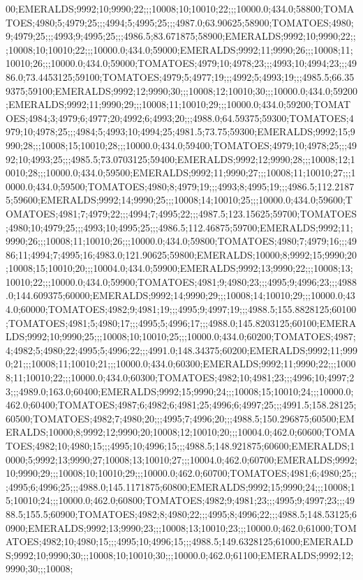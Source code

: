 00;EMERALDS;9992;10;9990;22;;;10008;10;10010;22;;;10000.0;434.0;58800;TOMATOES;4980;5;4979;25;;;4994;5;4995;25;;;4987.0;63.90625;58900;TOMATOES;4980;9;4979;25;;;4993;9;4995;25;;;4986.5;83.671875;58900;EMERALDS;9992;10;9990;22;;;10008;10;10010;22;;;10000.0;434.0;59000;EMERALDS;9992;11;9990;26;;;10008;11;10010;26;;;10000.0;434.0;59000;TOMATOES;4979;10;4978;23;;;4993;10;4994;23;;;4986.0;73.4453125;59100;TOMATOES;4979;5;4977;19;;;4992;5;4993;19;;;4985.5;66.359375;59100;EMERALDS;9992;12;9990;30;;;10008;12;10010;30;;;10000.0;434.0;59200;EMERALDS;9992;11;9990;29;;;10008;11;10010;29;;;10000.0;434.0;59200;TOMATOES;4984;3;4979;6;4977;20;4992;6;4993;20;;;4988.0;64.59375;59300;TOMATOES;4979;10;4978;25;;;4984;5;4993;10;4994;25;4981.5;73.75;59300;EMERALDS;9992;15;9990;28;;;10008;15;10010;28;;;10000.0;434.0;59400;TOMATOES;4979;10;4978;25;;;4992;10;4993;25;;;4985.5;73.0703125;59400;EMERALDS;9992;12;9990;28;;;10008;12;10010;28;;;10000.0;434.0;59500;EMERALDS;9992;11;9990;27;;;10008;11;10010;27;;;10000.0;434.0;59500;TOMATOES;4980;8;4979;19;;;4993;8;4995;19;;;4986.5;112.21875;59600;EMERALDS;9992;14;9990;25;;;10008;14;10010;25;;;10000.0;434.0;59600;TOMATOES;4981;7;4979;22;;;4994;7;4995;22;;;4987.5;123.15625;59700;TOMATOES;4980;10;4979;25;;;4993;10;4995;25;;;4986.5;112.46875;59700;EMERALDS;9992;11;9990;26;;;10008;11;10010;26;;;10000.0;434.0;59800;TOMATOES;4980;7;4979;16;;;4986;11;4994;7;4995;16;4983.0;121.90625;59800;EMERALDS;10000;8;9992;15;9990;20;10008;15;10010;20;;;10004.0;434.0;59900;EMERALDS;9992;13;9990;22;;;10008;13;10010;22;;;10000.0;434.0;59900;TOMATOES;4981;9;4980;23;;;4995;9;4996;23;;;4988.0;144.609375;60000;EMERALDS;9992;14;9990;29;;;10008;14;10010;29;;;10000.0;434.0;60000;TOMATOES;4982;9;4981;19;;;4995;9;4997;19;;;4988.5;155.8828125;60100;TOMATOES;4981;5;4980;17;;;4995;5;4996;17;;;4988.0;145.8203125;60100;EMERALDS;9992;10;9990;25;;;10008;10;10010;25;;;10000.0;434.0;60200;TOMATOES;4987;4;4982;5;4980;22;4995;5;4996;22;;;4991.0;148.34375;60200;EMERALDS;9992;11;9990;21;;;10008;11;10010;21;;;10000.0;434.0;60300;EMERALDS;9992;11;9990;22;;;10008;11;10010;22;;;10000.0;434.0;60300;TOMATOES;4982;10;4981;23;;;4996;10;4997;23;;;4989.0;163.0;60400;EMERALDS;9992;15;9990;24;;;10008;15;10010;24;;;10000.0;462.0;60400;TOMATOES;4987;6;4982;6;4981;25;4996;6;4997;25;;;4991.5;158.28125;60500;TOMATOES;4982;7;4980;20;;;4995;7;4996;20;;;4988.5;150.296875;60500;EMERALDS;10000;8;9992;12;9990;20;10008;12;10010;20;;;10004.0;462.0;60600;TOMATOES;4982;10;4980;15;;;4995;10;4996;15;;;4988.5;148.921875;60600;EMERALDS;10000;5;9992;13;9990;27;10008;13;10010;27;;;10004.0;462.0;60700;EMERALDS;9992;10;9990;29;;;10008;10;10010;29;;;10000.0;462.0;60700;TOMATOES;4981;6;4980;25;;;4995;6;4996;25;;;4988.0;145.1171875;60800;EMERALDS;9992;15;9990;24;;;10008;15;10010;24;;;10000.0;462.0;60800;TOMATOES;4982;9;4981;23;;;4995;9;4997;23;;;4988.5;155.5;60900;TOMATOES;4982;8;4980;22;;;4995;8;4996;22;;;4988.5;148.53125;60900;EMERALDS;9992;13;9990;23;;;10008;13;10010;23;;;10000.0;462.0;61000;TOMATOES;4982;10;4980;15;;;4995;10;4996;15;;;4988.5;149.6328125;61000;EMERALDS;9992;10;9990;30;;;10008;10;10010;30;;;10000.0;462.0;61100;EMERALDS;9992;12;9990;30;;;10008;